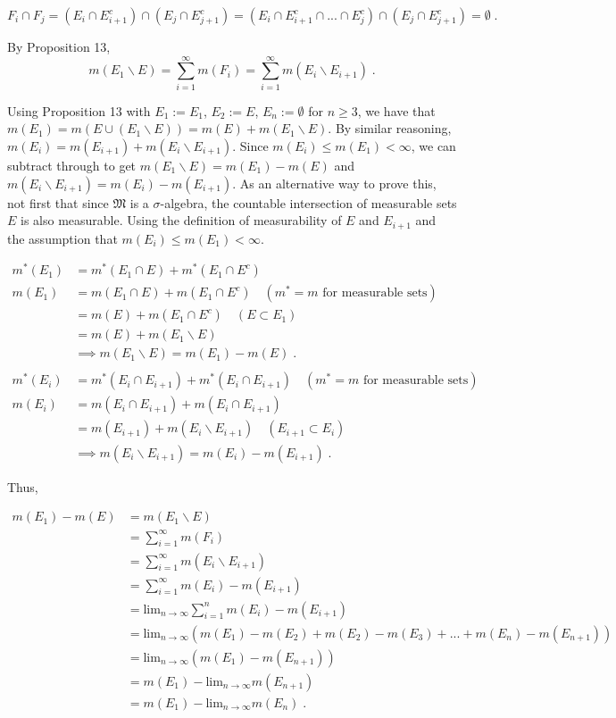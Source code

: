 \documentclass[a4paper]{article}
\begin{document}
$$F_i \cap F_j = (E_i \cap E_{i+1}^c ) \cap (E_j \cap E_{j+1}^c) = (E_i \cap E_{i+1}^c \cap ... \cap E_j^c ) \cap (E_j \cap E_{j+1}^c) = \emptyset \;.$$

By Proposition 13,
$$m(E_1 \backslash E) = \sum_{i=1}^\infty m(F_i) = \sum_{i=1}^\infty m(E_i \backslash E_{i+1}) \;.$$

Using Proposition 13 with $E_1 := E_1$, $E_2 := E$, $E_n := \emptyset$ for $n\geq 3$, we have that $m(E_1) = m(E\cup (E_1 \backslash E)) = m(E) + m(E_1 \backslash E)$. By similar reasoning, $m(E_i) = m(E_{i+1}) + m(E_i \backslash E_{i+1})$. Since $m(E_i) \leq m(E_1) < \infty$, we can subtract through to get $m(E_1\backslash E) = m(E_1) - m(E)$ and $m(E_i \backslash E_{i+1}) = m(E_i) - m(E_{i+1})$. As an alternative way to prove this, not first that since $\mathfrak{M}$ is a $\sigma$-algebra, the countable intersection of measurable sets $E$ is also measurable. Using the definition of measurability of $E$ and $E_{i+1}$ and the assumption that $m(E_i) \leq m(E_1) < \infty$.

\begin{align*}
m^*(E_1) &= m^*(E_1 \cap E) + m^*(E_1 \cap E^c)\\
m(E_1) &= m(E_1 \cap E) + m(E_1 \cap E^c) \quad (m^* = m \text{ for measurable sets})\\
&= m(E) + m(E_1 \cap E^c) \quad (E \subset E_1)\\
&= m(E) + m(E_1 \backslash E) \\
&\implies m(E_1 \backslash E) = m(E_1) - m(E) \;.\\
&\\
m^*(E_i) &= m^*(E_i \cap E_{i+1}) + m^*(E_i \cap E_{i+1})\quad (m^* = m \text{ for measurable sets})\\
m(E_i) &= m(E_i \cap E_{i+1}) + m(E_i \cap E_{i+1})\\
&= m(E_{i+1}) + m(E_i \backslash E_{i+1}) \quad (E_{i+1} \subset E_i)\\
&\implies m(E_i \backslash E_{i+1}) = m(E_i) - m(E_{i+1}) \;. 
\end{align*}

Thus,

\begin{align*}
m(E_1) -m(E) &= m(E_1 \backslash E)\\
&= \sum_{i=1}^\infty m(F_i)\\
&= \sum_{i=1}^\infty m(E_i \backslash E_{i+1})\\
&= \sum_{i=1}^\infty m(E_i) - m(E_{i+1}) \\
&= \text{lim}_{n\rightarrow \infty} \sum_{i=1}^n m(E_i) - m(E_{i+1})\\
&= \text{lim}_{n\rightarrow \infty} \left(m(E_1) - m(E_2) + m(E_2) - m(E_3) + ... + m(E_n) - m(E_{n+1})\right)\\
&= \text{lim}_{n\rightarrow \infty} \left( m(E_1) - m(E_{n+1})\right)\\
&= m(E_1) - \text{lim}_{n\rightarrow \infty} m(E_{n+1})\\
&= m(E_1) - \text{lim}_{n\rightarrow \infty} m(E_n) \;.
\end{align*}
\end{document}
